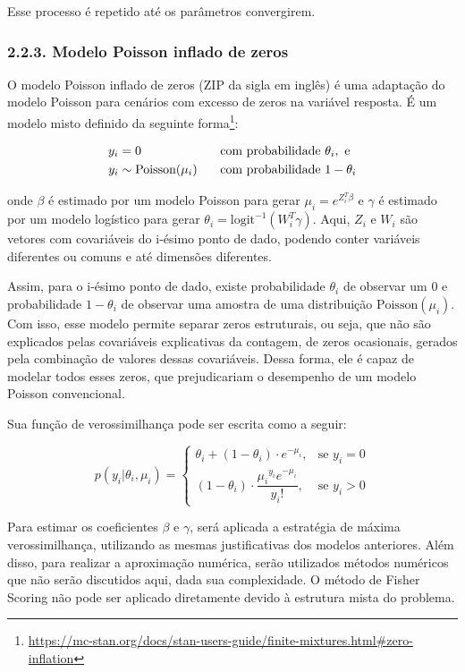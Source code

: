 \documentclass[
]{article}
\begin{document}
Esse processo é repetido até os parâmetros convergirem.

\subsubsection{2.2.3. Modelo Poisson inflado de
zeros}\label{modelo-poisson-inflado-de-zeros}

O modelo Poisson inflado de zeros (ZIP da sigla em inglês) é uma
adaptação do modelo Poisson para cenários com excesso de zeros na
variável resposta. É um modelo misto definido da seguinte
forma\footnote{\url{https://mc-stan.org/docs/stan-users-guide/finite-mixtures.html\#zero-inflation}}:

\[
\begin{aligned}
y_i = 0 \hspace{6em} &\text{ com probabilidade } \theta_i, \text{ e} \\
y_i \sim \text{Poisson}(\mu_i) \hspace{1.5em} &\text{  com probabilidade } 1-\theta_i
\end{aligned}
\]

onde \(\beta\) é estimado por um modelo Poisson para gerar
\(\mu_i = e^{Z_i^T\beta}\) e \(\gamma\) é estimado por um modelo
logístico para gerar \(\theta_i = \text{logit}^{-1}(W_i^T\gamma)\).
Aqui, \(Z_i\) e \(W_i\) são vetores com covariáveis do i-ésimo ponto de
dado, podendo conter variáveis diferentes ou comuns e até dimensões
diferentes.

Assim, para o i-ésimo ponto de dado, existe probabilidade \(\theta_i\)
de observar um 0 e probabilidade \(1-\theta_i\) de observar uma amostra
de uma distribuição \(\text{Poisson}(\mu_i)\). Com isso, esse modelo
permite separar zeros estruturais, ou seja, que não são explicados pelas
covariáveis explicativas da contagem, de zeros ocasionais, gerados pela
combinação de valores dessas covariáveis. Dessa forma, ele é capaz de
modelar todos esses zeros, que prejudicariam o desempenho de um modelo
Poisson convencional.

Sua função de verossimilhança pode ser escrita como a seguir:

\[
p(y_i | \theta_i, \mu_i) = 
\begin{cases}
\theta_i + (1-\theta_i) \cdot e^{-\mu_i}, & \text{se } y_i = 0 \\
(1-\theta_i) \cdot \dfrac{{\mu_i}^{y_i} e^{-\mu_i}}{y_i!}, & \text{se } y_i > 0
\end{cases}
\]

Para estimar os coeficientes \(\beta\) e \(\gamma\), será aplicada a
estratégia de máxima verossimilhança, utilizando as mesmas
justificativas dos modelos anteriores. Além disso, para realizar a
aproximação numérica, serão utilizados métodos numéricos que não serão
discutidos aqui, dada sua complexidade. O método de Fisher Scoring não
pode ser aplicado diretamente devido à estrutura mista do problema.
\end{document}
